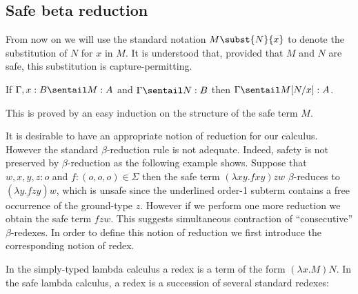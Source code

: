 \subsection*{Safe beta reduction}

From now on we will use the standard notation $M\subst{N}{x}$ to
denote the substitution of $N$ for $x$ in $M$.  It is understood that,
provided that $M$ and $N$ are safe, this substitution is
capture-permitting.


\begin{lemma}
\label{lem:subst_preserves_safety}
If $\Gamma, x :B \sentail M : A$ and $\Gamma \sentail N : B$ then $\Gamma \sentail M[N/x] : A$.
\end{lemma}
This is proved by an easy induction on the structure of the safe term $M$.
\smallskip

It is desirable to have an appropriate notion of reduction for our
calculus. However the standard $\beta$-reduction rule is not
adequate. Indeed, safety is not preserved by $\beta$-reduction as
the following example shows. Suppose that $w,x,y,z : o$ and $f :
(o,o,o) \in \Sigma$ then the safe term $(\lambda x y . f x y) z w$
$\beta$-reduces to $(\underline{\lambda y . f z y}) w$, which is
unsafe since the underlined order-1 subterm contains a free
occurrence of the ground-type $z$. However if we perform one more
reduction we obtain the safe term $f z w$. This suggests
simultaneous contraction of ``consecutive'' $\beta$-redexes. In
order to define this notion of reduction we first introduce the
corresponding notion of redex.

In the simply-typed lambda calculus a redex is a term of the form
$(\lambda x . M) N$. In the safe lambda calculus, a redex is a
succession of several standard redexes:

